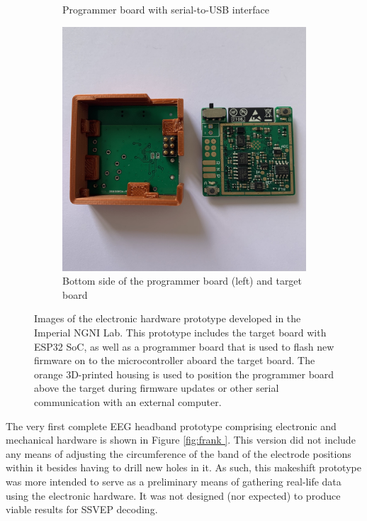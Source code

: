 \begin{figure}[!htb]
\begin{subfigure}[b]{0.3\textwidth}
         \caption{Programmer board with serial-to-USB interface }
         \label{fig:esp-hardware-programmer}
     \end{subfigure}
     \hfill
    \begin{subfigure}[b]{0.3\textwidth}
         \centering
         \includegraphics[width=\textwidth]{esp-both}
         \caption{Bottom side of the programmer board (left) and target board}
         \label{fig:esp-hardware-both}
     \end{subfigure}
        \caption[Images of the electronic hardware prototype developed in the Imperial NGNI Lab]{Images of the electronic hardware prototype developed in the Imperial NGNI Lab. This prototype includes the target board with ESP32 SoC, as well as a programmer board that is used to flash new firmware on to the microcontroller aboard the target board. The orange 3D-printed housing is used to position the programmer board above the target during firmware updates or other serial communication with an external computer.}
        \label{fig:esp-hardware}
\end{figure}

The very first complete EEG headband prototype comprising electronic and mechanical hardware is shown in Figure \ref{fig:frank
}. This version did not include any means of adjusting the circumference of the band of the electrode positions within it besides having to drill new holes in it. As such, this makeshift prototype was more intended to serve as a preliminary means of gathering real-life data using the electronic hardware. It was not designed (nor expected) to produce viable results for SSVEP decoding. 

